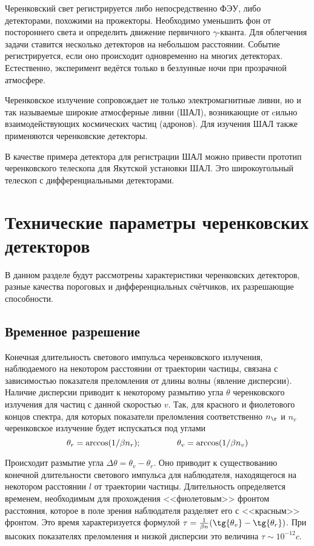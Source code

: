 \begin{main}
	Черенковский свет регистрируется либо непосредственно ФЭУ, либо детекторами, похожими на прожекторы. 
	Необходимо уменьшить фон от постороннего света и определить движение первичного $ \gamma $-кванта.
	 Для облегчения задачи ставится несколько детекторов на небольшом расстоянии. 
	Событие регистрируется, если оно происходит одновременно на многих детекторах.
	Естественно, эксперимент ведётся только в безлунные ночи при прозрачной атмосфере. 
	
	Черенковское излучение сопровождает не только электромагнитные ливни, но и так называемые широкие атмосферные ливни (ШАЛ), возникающие от cильно взаимодействующих космических частиц (адронов). Для изучения ШАЛ также применяются черенковские детекторы.
	
	В качестве примера детектора для регистрации ШАЛ можно привести прототип черенковского телескопа для Якутской установки ШАЛ. Это широкоугольный телескоп с дифференциальными детекторами. 
	
	\section{Технические параметры черенковских детекторов}
	\label{sec:section}
	В данном разделе будут рассмотрены характеристики черенковских детекторов, разные качества пороговых и дифференциальных счётчиков, их разрешающие способности.
	
	\subsection{Временное разрешение}
	\label{sec:subsection}
	Конечная длительность светового импульса черенковского излучения, наблюдаемого на некотором расстоянии от траектории частицы, связана с зависимостью показателя преломления от длины волны (явление дисперсии). Наличие дисперсии приводит к некоторому размытию угла $ \theta $ черенковского излучения для частиц с данной скоростью $ v $. Так, для красного и фиолетового концов спектра, для которых показатели преломления соответственно $n_{\r}$ и $n_v$ черенковское излучение будет испускаться под углами 
	$$\theta_r = \arccos({1/\beta n_r}); \hspace{1.5cm} \theta_v = \arccos({1/\beta n_v})$$	
	
	Происходит размытие угла $\Delta\theta = \theta_v - \theta_r$. Оно приводит к существованию конечной длительности светового импульса для наблюдателя, находящегося на некотором расстоянии $l$ от траектории частицы. Длительность определяется временем, необходимым для прохождения <<фиолетовым>> фронтом расстояния, которое в поле зрения наблюдателя разделяет его с <<красным>> фронтом.
	Это время характеризуется формулой $\tau = \frac{1}{\beta n}(\tg{\theta_v} - \tg{\theta_r})$. При высоких показателях преломления и низкой дисперсии это величина $\tau \sim 10^{-12} c$.
	

\end{main}

